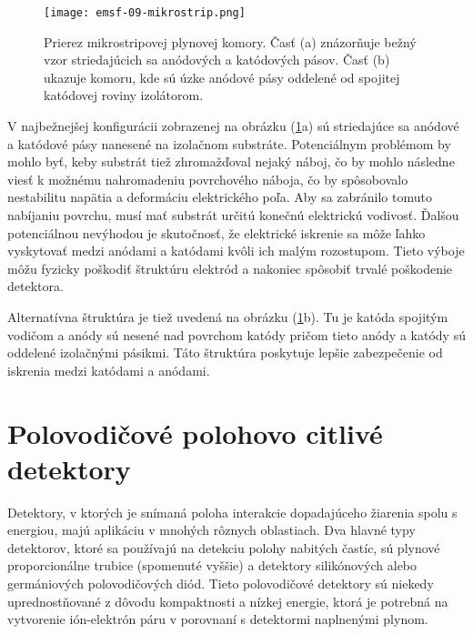 \documentclass[../../main.tex]{subfiles}
\begin{document}
\begin{figure}[!h]
\texttt{[image: emsf-09-mikrostrip.png]}
\centering
\caption{Prierez mikrostripovej plynovej komory. Časť (a) znázorňuje bežný vzor striedajúcich sa anódových a katódových pásov. Časť (b) ukazuje komoru, kde sú úzke anódové pásy oddelené od spojitej katódovej roviny izolátorom.}
\label{em9:fig:mikrostrip}
\end{figure}

V najbežnejšej konfigurácii zobrazenej na obrázku (\ref{em9:fig:mikrostrip}a) sú striedajúce sa anódové a katódové pásy nanesené na izolačnom substráte. Potenciálnym problémom by mohlo byť, keby substrát tiež zhromažďoval nejaký náboj, čo by mohlo následne viesť k možnému nahromadeniu povrchového náboja, čo by spôsobovalo nestabilitu napätia a deformáciu elektrického poľa. Aby sa zabránilo tomuto nabíjaniu povrchu, musí mať substrát určitú konečnú elektrickú vodivosť. Ďalšou potenciálnou nevýhodou je skutočnosť, že elektrické iskrenie sa môže ľahko vyskytovať medzi anódami a katódami kvôli ich malým rozostupom. Tieto výboje môžu fyzicky poškodiť štruktúru elektród a nakoniec spôsobiť trvalé poškodenie detektora.

Alternatívna štruktúra je tiež uvedená na obrázku (\ref{em9:fig:mikrostrip}b). Tu je katóda spojitým vodičom a anódy sú nesené nad povrchom katódy pričom tieto anódy a katódy sú oddelené izolačnými pásikmi. Táto štruktúra poskytuje lepšie zabezpečenie od iskrenia medzi katódami a anódami.

\section{Polovodičové polohovo citlivé detektory}
Detektory, v ktorých je snímaná poloha interakcie dopadajúceho žiarenia spolu s energiou, majú aplikáciu v mnohých rôznych oblastiach. Dva hlavné typy detektorov, ktoré sa používajú na detekciu polohy nabitých častíc, sú plynové proporcionálne trubice (spomenuté vyššie) a detektory silikónových alebo germániových polovodičových diód. Tieto polovodičové detektory sú niekedy uprednostňované z dôvodu kompaktnosti a nízkej energie, ktorá je potrebná na vytvorenie ión-elektrón páru v porovnaní s detektormi naplnenými plynom. 
\end{document}
